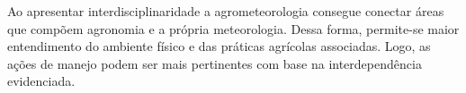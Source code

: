 \newpar Ao apresentar interdisciplinaridade a agrometeorologia consegue conectar áreas que compõem agronomia e a própria meteorologia. Dessa forma, permite-se maior entendimento do ambiente físico e das práticas agrícolas associadas. Logo, as ações de manejo podem ser mais pertinentes com base na interdependência evidenciada.